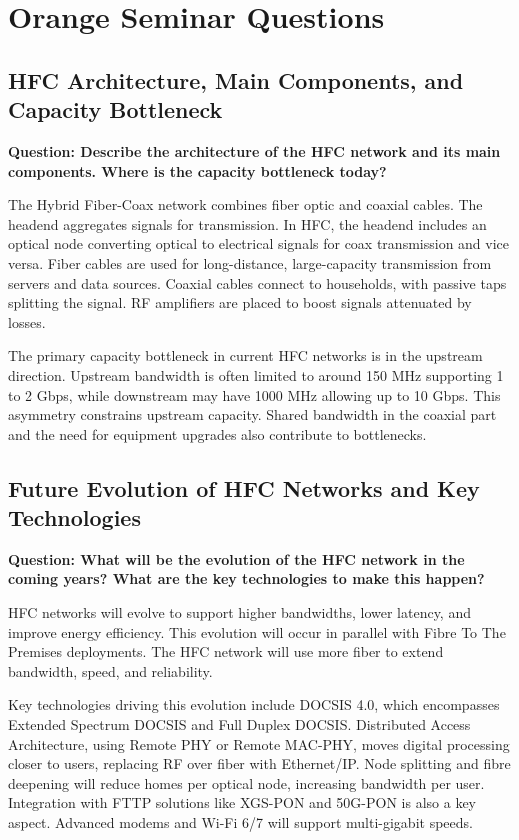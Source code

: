 \documentclass[11pt]{article}
\begin{document}
        \section{Orange Seminar Questions}
        \subsection{HFC Architecture, Main Components, and Capacity Bottleneck}
        \noindent\textbf{Question: Describe the architecture of the HFC network and its main components. Where is the capacity bottleneck today?}
        
        The Hybrid Fiber-Coax network combines fiber optic and coaxial cables. The headend aggregates signals for transmission. In HFC, the headend includes an optical node converting optical to electrical signals for coax transmission and vice versa. Fiber cables are used for long-distance, large-capacity transmission from servers and data sources. Coaxial cables connect to households, with passive taps splitting the signal. RF amplifiers are placed to boost signals attenuated by losses.
        
        The primary capacity bottleneck in current HFC networks is in the upstream direction. Upstream bandwidth is often limited to around 150 MHz supporting 1 to 2 Gbps, while downstream may have 1000 MHz allowing up to 10 Gbps. This asymmetry constrains upstream capacity. Shared bandwidth in the coaxial part and the need for equipment upgrades also contribute to bottlenecks.
        
        \subsection{Future Evolution of HFC Networks and Key Technologies}
        \noindent\textbf{Question: What will be the evolution of the HFC network in the coming years? What are the key technologies to make this happen?}
        
        HFC networks will evolve to support higher bandwidths, lower latency, and improve energy efficiency. This evolution will occur in parallel with Fibre To The Premises deployments. The HFC network will use more fiber to extend bandwidth, speed, and reliability.
        
        Key technologies driving this evolution include DOCSIS 4.0, which encompasses Extended Spectrum DOCSIS and Full Duplex DOCSIS. Distributed Access Architecture, using Remote PHY or Remote MAC-PHY, moves digital processing closer to users, replacing RF over fiber with Ethernet/IP. Node splitting and fibre deepening will reduce homes per optical node, increasing bandwidth per user. Integration with FTTP solutions like XGS-PON and 50G-PON is also a key aspect. Advanced modems and Wi-Fi 6/7 will support multi-gigabit speeds.
        
\end{document}
